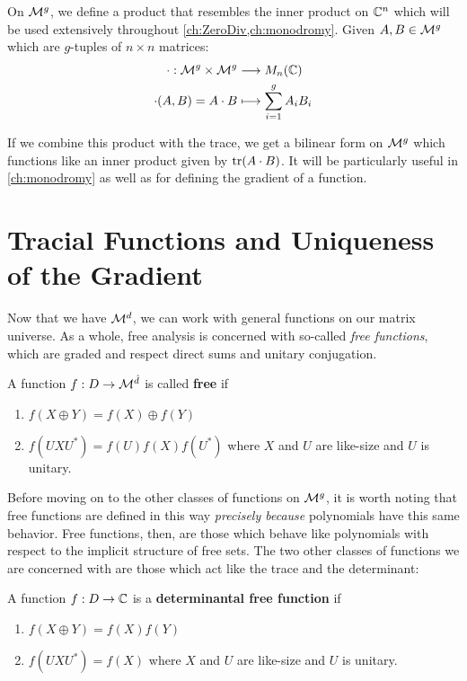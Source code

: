 On \(\mathcal{M}^{g} \), we define a product that resembles the inner product on
\(\mathbb{C}^n\) which will be used extensively throughout \cref{ch:ZeroDiv,ch:monodromy}.
Given \(A,B \in \mathcal{M}^{g} \) which are \(g\)-tuples of \(n \times n\) matrices:
\begin{align*}
	\cdot : \mathcal{M}^{g} \times \mathcal{M}^{g}  &\longrightarrow M_n(\mathbb{C}) \\
  \cdot (A,B) = A \cdot B &\longmapsto \sum_{i=1}^g A_i B_i
\end{align*}

If we combine this product with the trace, we get a bilinear form on
\(\mathcal{M}^{g} \) which functions like an inner product given by \(\operatorname{tr}(A \cdot B)\).
It will be particularly useful in \cref{ch:monodromy} as well as for defining the
gradient of a function.


\section{Tracial Functions and Uniqueness of the Gradient}%
\label{sec:TracGrad}
Now that we have \(\mathcal{M}^d\), we can work with general functions on our matrix
universe. As a whole, free analysis is concerned with so-called \emph{free
  functions}, which are graded and
respect direct sums and unitary conjugation.

\begin{definition}
\label{def:FreeFun}
  A function \(f: D\to \mathcal{M}^{\hat{d}}\) is called \textbf{free} if
  \begin{enumerate}
    \item \(f(X\oplus Y)= f(X) \oplus f(Y)\)
    \item \(f(U X U^*) = f(U)f(X)f(U^*)\) where \(X\) and \(U\) are like-size
          and \(U\) is unitary.
  \end{enumerate}
\end{definition}

Before moving on to the other classes of functions on \(\mathcal{M}^{g}\), it is worth
noting that free functions are defined in this way \emph{precisely because}
polynomials have this same behavior. Free functions, then, are those which
behave like polynomials with respect to the implicit structure of free sets.
The two other classes of functions we are concerned with are those which act like
the trace and the determinant:
\begin{definition}%
\label{def:DetFreeFun}
  A function \(f: D \to \mathbb{C} \) is a \textbf{determinantal free function} if
  \begin{enumerate}
    \item \(f(X\oplus Y) = f(X)f(Y)\)
    \item \(f(U X U^*) = f(X)\) where \(X\) and \(U\) are like-size
          and \(U\) is unitary.
  \end{enumerate}
\end{definition}


